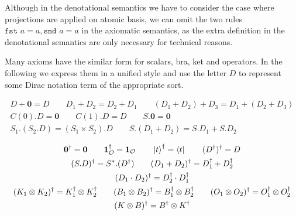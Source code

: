 \documentclass[manuscript, review, timestamp]{acmart}
\newcommand*{\fst}{\texttt{fst }}
\newcommand*{\snd}{\texttt{snd }}
\begin{document}
Although in the denotational semantics we have to consider the case where projections are applied on atomic basis, we can omit the two rules 
$
\fst a = a,
\snd a = a
$
in the axiomatic semantics, as the extra definition in the denotational semantics are only necessary for technical reasons.



Many axioms have the similar form for scalars, bra, ket and operators. In the following we express them in a unified style and use the letter $D$ to represent some Dirac notation term of the appropriate sort.

\begin{definition}
  \begin{gather*}
    D + \mathbf{0} = D
    \qquad
    D_1 + D_2 = D_2 + D_1
    \qquad
    (D_1 + D_2) + D_3 = D_1 + (D_2 + D_3) \\
    C(0).D = \mathbf{0}
    \qquad
    C(1).D = D
    \qquad
    S.\mathbf{0} = \mathbf{0} \\
    S_1.(S_2.D) = (S_1 \times S_2).D
    \qquad
    S.(D_1 + D_2) = S.D_1 + S.D_2
  \end{gather*}
\end{definition}

\begin{definition}
  \begin{gather*}
    \textbf{0}^\dagger = \textbf{0}
    \qquad
    \mathbf{1}_\mathcal{O}^\dagger = \mathbf{1}_\mathcal{O}
    \qquad
    \ket{t}^\dagger = \bra{t}
    \qquad
    (D^\dagger)^\dagger = D \\
    (S.D)^\dagger = S^*.(D^\dagger)
    \qquad
    (D_1 + D_2)^\dagger = D_1^\dagger + D_2^\dagger \\
    (D_1 \cdot D_2)^\dagger = D_2^\dagger \cdot D_1^\dagger \\
    (K_1 \otimes K_2)^\dagger = K_1^\dagger \otimes K_2^\dagger
    \qquad
    (B_1 \otimes B_2)^\dagger = B_1^\dagger \otimes B_2^\dagger
    \qquad
    (O_1 \otimes O_2)^\dagger = O_1^\dagger \otimes O_2^\dagger \\
    (K \otimes B)^\dagger = B^\dagger \otimes K^\dagger
  \end{gather*}
\end{definition}
\end{document}
